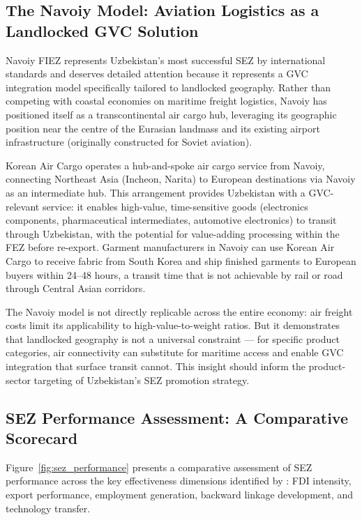 \subsection{The Navoiy Model: Aviation Logistics as a Landlocked GVC Solution}

Navoiy FIEZ represents Uzbekistan's most successful SEZ by international standards and deserves detailed attention because it represents a GVC integration model specifically tailored to landlocked geography. Rather than competing with coastal economies on maritime freight logistics, Navoiy has positioned itself as a transcontinental air cargo hub, leveraging its geographic position near the centre of the Eurasian landmass and its existing airport infrastructure (originally constructed for Soviet aviation).

Korean Air Cargo operates a hub-and-spoke air cargo service from Navoiy, connecting Northeast Asia (Incheon, Narita) to European destinations via Navoiy as an intermediate hub. This arrangement provides Uzbekistan with a GVC-relevant service: it enables high-value, time-sensitive goods (electronics components, pharmaceutical intermediates, automotive electronics) to transit through Uzbekistan, with the potential for value-adding processing within the FEZ before re-export. Garment manufacturers in Navoiy can use Korean Air Cargo to receive fabric from South Korea and ship finished garments to European buyers within 24--48 hours, a transit time that is not achievable by rail or road through Central Asian corridors.

The Navoiy model is not directly replicable across the entire economy: air freight costs limit its applicability to high-value-to-weight ratios. But it demonstrates that landlocked geography is not a universal constraint --- for specific product categories, air connectivity can substitute for maritime access and enable GVC integration that surface transit cannot. This insight should inform the product-sector targeting of Uzbekistan's SEZ promotion strategy.

\subsection{SEZ Performance Assessment: A Comparative Scorecard}

Figure~\ref{fig:sez_performance} presents a comparative assessment of SEZ performance across the key effectiveness dimensions identified by \citet{farole2011}: FDI intensity, export performance, employment generation, backward linkage development, and technology transfer.

